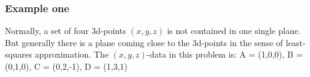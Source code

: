 \subsubsection{Example one}
Normally, a set of four 3d-points $(x, y, z)$ is not contained in one single plane. But generally there
is a plane coming close to the 3d-points in the sense of least-squares approximation.\newline
The $(x, y, z)$-data in this problem is: A = (1,0,0), B = (0,1,0), C = (0,2,-1), D = (1,3,1)
